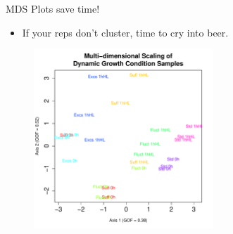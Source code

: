 \documentclass[t]{beamer}
\begin{document}
\begin{frame}{MDS Plots save time!}
  \begin{itemize}
    \item If your reps don't cluster, time to cry into beer.
  \end{itemize}
  \begin{figure}[h]
    \begin{center}
      \includegraphics[width=0.6\textwidth]{img/txv-res-plotmds.pdf}
    \end{center}
  \end{figure}
\end{frame}
\end{document}
